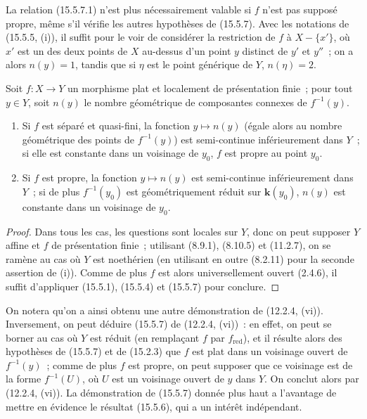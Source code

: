 \begin{remark}[15.5.8]
\label{IV.15.5.8-fr}
La relation (15.5.7.1) n'est plus nécessairement valable si $f$ n'est pas supposé propre, même s'il vérifie les autres hypothèses de (15.5.7). Avec les notations de (15.5.5, (i)), il suffit pour le voir de considérer la restriction de $f$ à $X-\{x'\}$, où $x'$ est un des deux points de $X$ au-dessus d'un point $y$ distinct de $y'$ et $y''$~; on a alors $n(y)=1$, tandis que si $\eta$ est le point générique de $Y$, $n(\eta)=2$.
\end{remark}

\begin{proposition}[15.5.9]
\label{IV.15.5.9-fr}
Soit $f:X\to Y$ un morphisme plat et localement de présentation finie~; pour tout $y\in Y$, soit $n(y)$ le nombre géométrique de composantes connexes de $f^{-1}(y)$.
\begin{enumerate}[label=\emph{(\roman*)}]
  \item Si $f$ est séparé et quasi-fini, la fonction $y\mapsto n(y)$ (égale alors au nombre géométrique des points de $f^{-1}(y)$) est semi-continue inférieurement dans $Y$~; si elle est constante dans un voisinage de $y_0$, $f$ est propre au point $y_0$.
  \item Si $f$ est propre, la fonction $y\mapsto n(y)$ est semi-continue inférieurement dans $Y$~; si de plus $f^{-1}(y_0)$ est géométriquement réduit sur $\mathbf{k}(y_0)$, $n(y)$ est constante dans un voisinage de $y_0$.
\end{enumerate}
\end{proposition}

\begin{proof}
Dans tous les cas, les questions sont locales sur $Y$, donc on peut supposer $Y$ affine et $f$ de présentation finie~; utilisant (8.9.1), (8.10.5) et (11.2.7), on se ramène au cas où $Y$ est noethérien (en utilisant en outre (8.2.11) pour la seconde assertion de (i)). Comme de plus $f$ est alors universellement ouvert (2.4.6), il suffit d'appliquer (15.5.1), (15.5.4) et (15.5.7) pour conclure.
\end{proof}

\begin{remark}[15.5.10]
\label{IV.15.5.10-fr}
On notera qu'on a ainsi obtenu une autre démonstration de (12.2.4, (vi)). Inversement, on peut déduire (15.5.7) de (12.2.4, (vi))~: en effet, on peut se borner au cas où $Y$ est réduit (en remplaçant $f$ par $f_{\mathrm{red}}$), et il résulte alors des hypothèses de (15.5.7) et de (15.2.3) que $f$ est plat dans un voisinage ouvert de $f^{-1}(y)$~; comme de plus $f$ est propre, on peut supposer que ce voisinage est de la forme $f^{-1}(U)$, où $U$ est un voisinage ouvert de $y$ dans $Y$. On conclut alors par (12.2.4, (vi)). La démonstration de (15.5.7) donnée plus haut a l'avantage de mettre en évidence le résultat (15.5.6), qui a un intérêt indépendant.
\end{remark}

